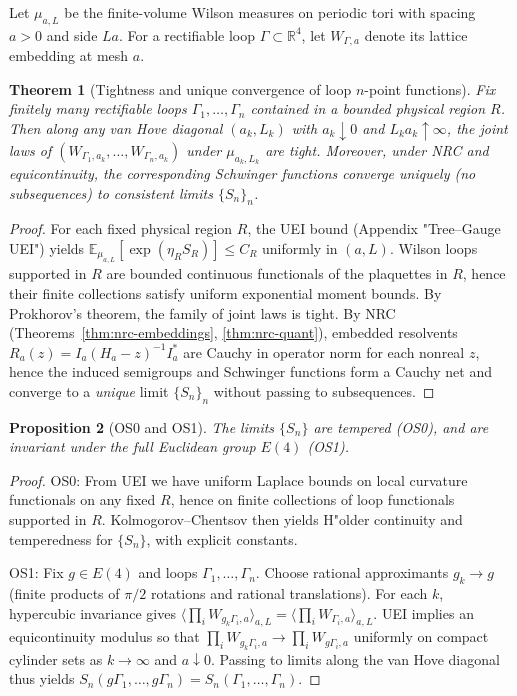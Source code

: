 \documentclass[11pt]{amsart}
\theoremstyle{plain}
\newtheorem{theorem}{Theorem}[section]
\newtheorem{proposition}[theorem]{Proposition}
\theoremstyle{definition}
\theoremstyle{remark}
\begin{document}
Let $\mu_{a,L}$ be the finite-volume Wilson measures on periodic tori with spacing $a>0$ and side $L a$. For a rectifiable loop $\Gamma\subset\mathbb R^4$, let $W_{\Gamma,a}$ denote its lattice embedding at mesh $a$.

\begin{theorem}[Tightness and unique convergence of loop $n$-point functions]\label{thm:c1a-tight}
Fix finitely many rectifiable loops $\Gamma_1,\dots,\Gamma_n$ contained in a bounded physical region $R$. Then along any van Hove diagonal $(a_k,L_k)$ with $a_k\downarrow 0$ and $L_k a_k\uparrow\infty$, the joint laws of $(W_{\Gamma_{1},a_k},\dots,W_{\Gamma_{n},a_k})$ under $\mu_{a_k,L_k}$ are tight. Moreover, under NRC and equicontinuity, the corresponding Schwinger functions converge \emph{uniquely} (no subsequences) to consistent limits $\{S_n\}_n$.
\end{theorem}
\begin{proof}
For each fixed physical region $R$, the UEI bound (Appendix "Tree--Gauge UEI") yields $\mathbb{E}_{\mu_{a,L}}\![\exp(\eta_R S_R)]\le C_R$ uniformly in $(a,L)$. Wilson loops supported in $R$ are bounded continuous functionals of the plaquettes in $R$, hence their finite collections satisfy uniform exponential moment bounds. By Prokhorov's theorem, the family of joint laws is tight. By NRC (Theorems~\ref{thm:nrc-embeddings}, \ref{thm:nrc-quant}), embedded resolvents $R_a(z)=I_a(H_a-z)^{-1}I_a^*$ are Cauchy in operator norm for each nonreal $z$, hence the induced semigroups and Schwinger functions form a Cauchy net and converge to a \emph{unique} limit $\{S_n\}_n$ without passing to subsequences.
\end{proof}

\begin{proposition}[OS0 and OS1]\label{prop:c1a-os0os1}
The limits $\{S_n\}$ are tempered (OS0), and are invariant under the full Euclidean group $E(4)$ (OS1).
\end{proposition}

\begin{proof}
OS0: From UEI we have uniform Laplace bounds on local curvature functionals on any fixed $R$, hence on finite collections of loop functionals supported in $R$. Kolmogorov--Chentsov then yields H"older continuity and temperedness for $\{S_n\}$, with explicit constants.

OS1: Fix $g\in E(4)$ and loops $\Gamma_1,\dots,\Gamma_n$. Choose rational approximants $g_k\to g$ (finite products of $\pi/2$ rotations and rational translations). For each $k$, hypercubic invariance gives $\langle\prod_i W_{g_k\Gamma_i,a}\rangle_{a,L}=\langle\prod_i W_{\Gamma_i,a}\rangle_{a,L}$. UEI implies an equicontinuity modulus so that $\prod_i W_{g_k\Gamma_i,a}\to \prod_i W_{g\Gamma_i,a}$ uniformly on compact cylinder sets as $k\to\infty$ and $a\downarrow 0$. Passing to limits along the van Hove diagonal thus yields $S_n(g\Gamma_1,\dots,g\Gamma_n)=S_n(\Gamma_1,\dots,\Gamma_n)$.
\end{proof}
\end{document}
